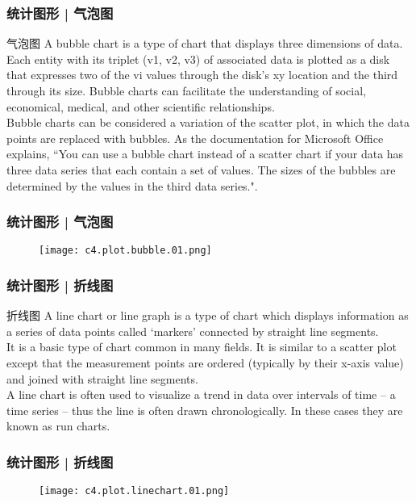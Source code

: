 \begin{frame}
  \frametitle{统计图形 | 气泡图}
  \begin{block}{气泡图}
    A bubble chart is a type of chart that displays three dimensions of data. Each entity with its triplet (v1, v2, v3) of associated data is plotted as a disk that expresses two of the vi values through the disk's xy location and the third through its size. Bubble charts can facilitate the understanding of social, economical, medical, and other scientific relationships.\\
    \vspace{0.5em}
Bubble charts can be considered a variation of the scatter plot, in which the data points are replaced with bubbles. As the documentation for Microsoft Office explains, ``You can use a bubble chart instead of a scatter chart if your data has three data series that each contain a set of values. The sizes of the bubbles are determined by the values in the third data series.".
  \end{block}
\end{frame}

\begin{frame}
  \frametitle{统计图形 | 气泡图}
  \begin{figure}
    \centering
    \texttt{[image: c4.plot.bubble.01.png]}
  \end{figure}
\end{frame}

\begin{frame}
  \frametitle{统计图形 | 折线图}
  \begin{block}{折线图}
    A line chart or line graph is a type of chart which displays information as a series of data points called `markers' connected by straight line segments.\\
    \vspace{0.5em}
    It is a basic type of chart common in many fields. It is similar to a scatter plot except that the measurement points are ordered (typically by their x-axis value) and joined with straight line segments.\\
    \vspace{0.5em}
    A line chart is often used to visualize a trend in data over intervals of time – a time series – thus the line is often drawn chronologically. In these cases they are known as run charts.
  \end{block}
\end{frame}

\begin{frame}
  \frametitle{统计图形 | 折线图}
  \begin{figure}
    \centering
    \texttt{[image: c4.plot.linechart.01.png]}
  \end{figure}
\end{frame}

